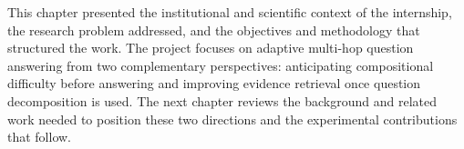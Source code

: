 This chapter presented the institutional and scientific context of the
internship, the research problem addressed, and the objectives and methodology
that structured the work. The project focuses on adaptive multi-hop question
answering from two complementary perspectives: anticipating compositional
difficulty before answering and improving evidence retrieval once question
decomposition is used. The next chapter reviews the background and related work
needed to position these two directions and the experimental contributions that
follow.

